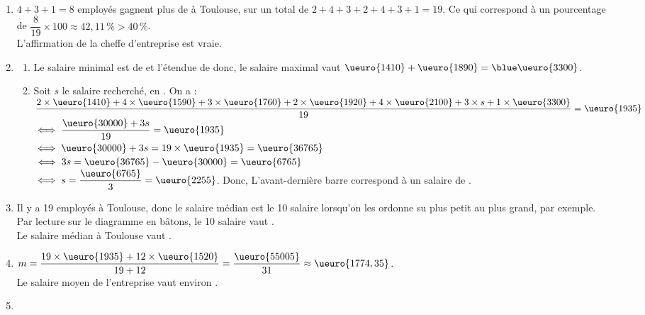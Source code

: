 \begin{corrige}
\ \\ [-5mm]
   \begin{enumerate}
      \item $4+3+1 =8$ employés gagnent plus de  à Toulouse, sur un total de $2+4+3+2+4+3+1 =19$. Ce qui correspond à un pourcentage de $\dfrac{8}{19}\times100 \approx42,11\,\%>40\,\%$. \\ [1mm]
         {\blue L'affirmation de la cheffe d'entreprise est vraie}.
      \item
         \begin{enumerate}
            \item Le salaire minimal est de  et l'étendue de  donc, {\blue le salaire maximal vaut} $\ueuro{1410}+\ueuro{1890} ={\blue \ueuro{3300}}$. \\
            \item Soit $s$ le salaire recherché, en \ueuro{}. On a : \\ [2mm]
               $\dfrac{2\times\ueuro{1410}+4\times\ueuro{1590}+3\times\ueuro{1760}+2\times\ueuro{1920}+4\times\ueuro{2100}+3\times s+1\times\ueuro{3300}}{19} =\ueuro{1935}$ \\ [1mm]
               $\iff \dfrac{\ueuro{30000}+3s}{19} =\ueuro{1935}$ \\ [2mm]
               $\iff \ueuro{30000}+3s =19\times\ueuro{1935} =\ueuro{36765}$ \\ [1mm]
               $\iff 3s =\ueuro{36765}-\ueuro{30000} =\ueuro{6765}$ \\ [2mm]
               $\iff s =\dfrac{\ueuro{6765}}{3} =\ueuro{2255}$. Donc, {\blue L'avant-dernière barre correspond à un salaire de }. \medskip
         \end{enumerate}
      \setcounter{enumi}{2}
      \item Il y a 19 employés à Toulouse, donc le salaire médian est le 10 salaire lorsqu'on les ordonne su plus petit au plus grand, par exemple. Par lecture sur le diagramme en bâtons, le 10 salaire vaut . \\
         {\blue Le salaire médian à Toulouse vaut }. \medskip
      \item $m =\dfrac{19\times\ueuro{1935}+12\times\ueuro{1520}}{19+12} =\dfrac{\ueuro{55005}}{31} \approx\ueuro{1774,35}$. \\ [2mm]
         {\blue Le salaire moyen de l'entreprise vaut environ }.
      \item 

\end{enumerate}
\end{corrige}

